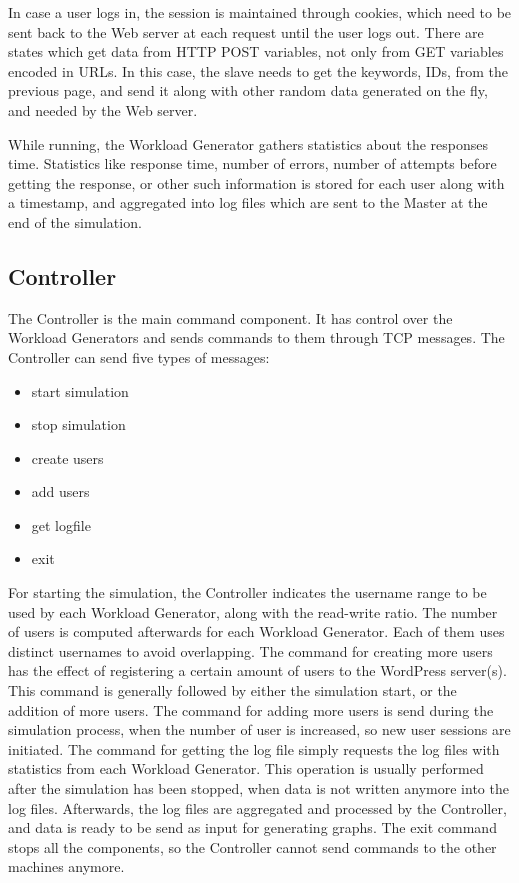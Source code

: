 In case a user logs in, the session is maintained through cookies, which need to be sent back to the Web server at each request until the user logs out. There are states which get data from HTTP POST variables, not only from GET variables encoded in URLs. In this case, the slave needs to get the keywords, IDs, from the previous page, and send it along with other random data generated on the fly, and needed by the Web server. 

While running, the Workload Generator gathers statistics about the responses time. Statistics like response time, number of errors, number of attempts before getting the response, or other such information is stored for each user along with a timestamp, and aggregated into log files which are sent to the Master at the end of the simulation.

\subsection{Controller}
\label{sub-sec:controller}

The Controller is the main command component. It has control over the Workload Generators and sends commands to them through TCP messages. The Controller can send five types of messages:
\begin{itemize}
 \item start simulation
 \item stop simulation
 \item create users
 \item add users
 \item get logfile
 \item exit
\end{itemize}

For starting the simulation, the Controller indicates the username range to be used by each Workload Generator, along with the read-write ratio. The number of users is computed afterwards for each Workload Generator. Each of them uses distinct usernames to avoid overlapping. The command for creating more users has the effect of registering a certain amount of users to the WordPress server(s). This command is generally followed by either the simulation start, or the addition of more users. The command for adding more users is send during the simulation process, when the number of user is increased, so new user sessions are initiated. The command for getting the log file simply requests the log files with statistics from each Workload Generator. This operation is usually performed after the simulation has been stopped, when data is not written anymore into the log files. Afterwards, the log files are aggregated and processed by the Controller, and data is ready to be send as input for generating graphs. The exit command stops all the components, so the Controller cannot send commands to the other machines anymore.

